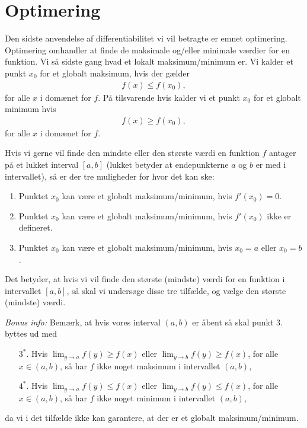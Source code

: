 \section{Optimering}
\noindent Den sidste anvendelse af differentiabilitet vi vil betragte er emnet optimering. Optimering omhandler at finde de maksimale og/eller minimale værdier for en funktion. Vi så sidste gang hvad et lokalt maksimum/minimum er. Vi kalder et punkt $x_0$ for et globalt maksimum, hvis der gælder 
\begin{align*}
f(x) \leq f(x_0),
\end{align*}
for alle $x$ i domænet for $f$. På tilsvarende hvis kalder vi et punkt $x_0$ for et globalt minimum hvis
\begin{align*}
f(x) \geq f(x_0),
\end{align*}
for alle $x$ i domænet for $f$.

Hvis vi gerne vil finde den mindste eller den største værdi en funktion $f$ antager på et lukket interval $[a,b]$ (lukket betyder at endepunkterne $a$ og $b$ er med i intervallet), så er der tre muligheder for hvor det kan ske:
\begin{enumerate}
\item Punktet $x_0$ kan være et globalt maksimum/minimum, hvis $f'(x_0)=0$.
\item Punktet $x_0$ kan være et globalt maksimum/minimum, hvis $f'(x_0)$ ikke er defineret.
\item Punktet $x_0$ kan være et globalt maksimum/minimum, hvis $x_0=a$ eller $x_0=b$.
\end{enumerate}
Det betyder, at hvis vi vil finde den største (mindste) værdi for en funktion i intervallet $[a,b]$, så skal vi undersøge disse tre tilfælde, og vælge den største (mindste) værdi.

\emph{Bonus info:} Bemærk, at hvis vores interval $(a,b)$ er åbent så skal punkt $3$. byttes ud med 
\begin{itemize}
\item[$3^*$.] Hvis $\displaystyle\lim_{y \to a}f(y) \geq f(x)$ eller $\displaystyle\lim_{y \to b}f(y) \geq f(x)$, for alle $x \in (a,b)$, så har $f$ ikke noget maksimum i intervallet $(a,b)$,
\item[$4^*$.] Hvis $\displaystyle\lim_{y \to a}f(y) \leq f(x)$ eller $\displaystyle\lim_{y \to b}f(y) \leq f(x)$, for alle $x \in (a,b)$, så har $f$ ikke noget minimum i intervallet $(a,b)$,
\end{itemize}
da vi i det tilfælde ikke kan garantere, at der er et globalt maksimum/minimum.

